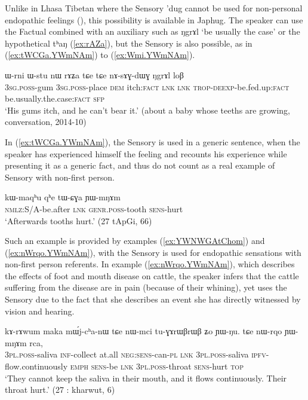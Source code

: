 \documentclass[oldfontcommands,oneside,a4paper,11pt]{article}
\newcommand{\ipa}[1]{{\phon \mbox{#1}}} %
\newcommand{\refb}[1]{(\ref{#1})}
\newcommand{\factual}[1]{\textsc{:fact}}
\begin{document}
Unlike in Lhasa Tibetan where the Sensory \ipa{'dug} cannot be used for non-personal endopathic feelings (\citealt{tournadre14evidentiality}), this possibility is available in Japhug. The speaker can use the Factual combined with an auxiliary such as \ipa{ŋgrɤl}  `be usually the case' or the hypothetical \ipa{tʰaŋ} (\ref{ex:rAZa}), but the Sensory is also possible, as in \refb{ex:tWCGa.YWmNAm} to \refb{ex:Wmi.YWmNAm}.


\begin{exe}
\ex \label{ex:rAZa}
\gll
\ipa{ɯ-rni}  	\ipa{ɯ-stu}  	\ipa{nɯ}  	\ipa{rɤʑa}  	\ipa{tɕe}  	\ipa{tɕe}  	\ipa{nɤ-sɤɣ-dɯɣ}  	\ipa{ŋgrɤl}  	\ipa{loβ}  \\
\textsc{3sg.poss}-gum \textsc{3sg.poss}-place \textsc{dem} itch\factual{} \textsc{lnk} \textsc{lnk} \textsc{trop-deexp}-be.fed.up\factual{} be.usually.the.case\factual{} \textsc{sfp} \\
\glt `His gums itch, and he can't bear it.' (about a baby whose teeths are growing, conversation, 2014-10)
\end{exe}

In \refb{ex:tWCGa.YWmNAm}, the Sensory is used in a generic sentence, when the speaker has experienced himself the feeling and recounts his experience while presenting it as a generic fact, and thus do not count as a real example of Sensory with non-first person.

\begin{exe}
\ex \label{ex:tWCGa.YWmNAm}
\gll
\ipa{kɯ-maqʰu}  	\ipa{qʰe}  	\ipa{tɯ-ɕɣa}  	\ipa{ɲɯ-mŋɤm}  \\
\textsc{nmlz}:S/A-be.after \textsc{lnk} \textsc{genr.poss}-tooth \textsc{sens}-hurt \\
\glt `Afterwards tooths hurt.' (27 tApGi, 66)
\end{exe}

Such an example is provided by examples \refb{ex:YWNWGAtChom} and \refb{ex:nWrqo.YWmNAm},  with the Sensory is used for endopathic sensations with non-first person referents. In example \refb{ex:nWrqo.YWmNAm}, which describes the effects of foot and mouth disease on cattle, the speaker  infers that the cattle suffering from the disease are in pain (because of their whining), yet uses the Sensory due to the fact that she describes an event she has directly witnessed by vision and hearing. 

\begin{exe}
\ex \label{ex:nWrqo.YWmNAm}
\gll \ipa{nɯ-mci} 	\ipa{kɤ-rɤwum} 	\ipa{maka} 	\ipa{mɯ́j-cʰa-nɯ} 	\ipa{tɕe} 	\ipa{nɯ-mci} 	\ipa{tu-ɣɤrɯβrɯβ} 	\ipa{ʑo} 	\ipa{ɲɯ-ŋu.}  
\ipa{tɕe} 	\ipa{nɯ-rqo} 	\ipa{ɲɯ-mŋɤm} 	\ipa{rca,} \\
\textsc{3pl.poss}-saliva \textsc{inf}-collect at.all \textsc{neg:sens}-can-\textsc{pl} \textsc{lnk} \textsc{3pl.poss}-saliva \textsc{ipfv}-flow.continuously \textsc{emph} \textsc{sens}-be \textsc{lnk} \textsc{3pl.poss}-throat \textsc{sens}-hurt \textsc{top}  \\
\glt `They cannot keep the saliva in their mouth, and it flows continuously. Their throat hurt.' (27 : kharwut, 6)
\end{exe}
\end{document}
